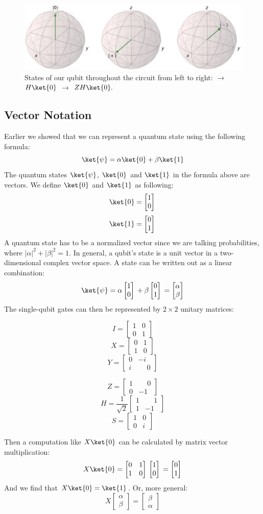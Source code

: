 \documentclass[11pt]{article}
\newcommand{\igate}{
  \begin{bmatrix}
  1 & 0 \\
  0 & 1 
  \end{bmatrix}
}
\newcommand{\xgate}{
  \begin{bmatrix}
  0 & 1 \\
  1 & 0 
  \end{bmatrix}
}
\newcommand{\ygate}{
  \begin{bmatrix}
  0 & -i \\
  i & \phantom{-}0
  \end{bmatrix}
}
\newcommand{\zgate}{
  \begin{bmatrix}
  1 & \phantom{-}0 \\
  0 & -1
  \end{bmatrix}
}
\newcommand{\hgate}{
  \dfrac{1}{\sqrt2}
  \begin{bmatrix}
  1 & \phantom{-}1 \\
  1 & -1
  \end{bmatrix}
}
\newcommand{\sgate}{
  \begin{bmatrix}
  1 & 0 \\
  0 & i
  \end{bmatrix}
}
\newcommand{\qstatezero}{
  \begin{bmatrix}1 \\ 0\end{bmatrix}
}
\newcommand{\qstateone}{
  \begin{bmatrix}0 \\ 1\end{bmatrix}
}
\begin{document}
\begin{figure}[ht]
  \centering
  \includegraphics[scale=0.37]{images/simple_circuit.eps}
  \caption{States of our qubit throughout the circuit from left to right:  $\rightarrow$ $H\ket{0}$ $\rightarrow$ $ZH\ket{0}.$}
  \label{fig:gate_rotations}
\end{figure}

\subsection{Vector Notation} \label{sec:matrix_notation}
Earlier we showed that we can represent a quantum state using the following formula:
\[\ket{\psi} = \alpha\ket{0} + \beta\ket{1}\]
The quantum states $\ket{\psi}$, $\ket{0}$ and $\ket{1}$ in the formula above are vectors. We define $\ket{0}$ and $\ket{1}$ as following:
\[\ket{0} = \qstatezero{}\]
\[\ket{1} = \qstateone{}\]
A quantum state has to be a normalized vector since we are talking probabilities, where $|\alpha|^2+|\beta|^2 = 1$. In general, a qubit's state is a unit vector in a two-dimensional complex vector space. A state can be written out as a linear combination:
\[
  \ket{\psi} = \alpha\qstatezero{} + \beta\qstateone{} =
\begin{bmatrix}\alpha \\ \beta\end{bmatrix}
\]
The single-qubit gates can then be represented by $2 \times 2$ unitary matrices:
\setlength\multicolsep{0pt}
\begin{multicols}{3}
  \[
    I = \igate{}
  \]
  \vfill
  \[
    X = \xgate{}
  \]
  \vfill
  \[
    Y = \ygate{}
  \]
\end{multicols}

\begin{multicols}{3}
  \[
    Z = \zgate{}
  \]
  \vfill
  \[
    H = \hgate{}
  \]
  \vfill
  \[
    S = \sgate{}
  \]
\end{multicols}
\bigskip
\noindent
Then a computation like $X\ket{0}$ can be calculated by matrix vector multiplication:
\[
X\ket{0} = \xgate{} \qstatezero{} = \qstateone{}
\]
And we find that $X\ket{0} = \ket{1}$. Or, more general:
\[
  X\begin{bmatrix}\alpha \\ \beta\end{bmatrix} = \begin{bmatrix}\beta \\ \alpha\end{bmatrix}
\]
\end{document}
